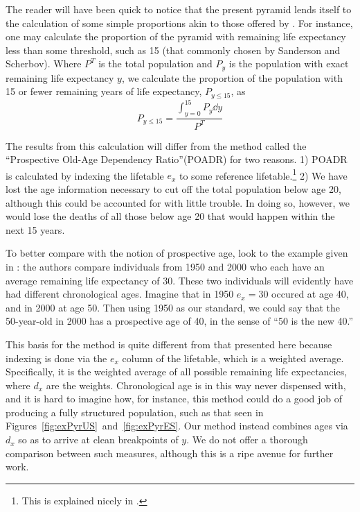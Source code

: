 \FloatBarrier
\label{sec:exageing}
The reader will have been quick to notice that the present pyramid lends itself
to the calculation of some simple proportions akin to those offered by
\citet[e.g.,][]{sanderson2005average}. For instance, one may calculate the
proportion of the pyramid with remaining life expectancy less than some
threshold, such as 15 (that commonly chosen by Sanderson and Scherbov). Where
$P^T$ is the total population and $P_y$ is the population with exact remaining
life expectancy $y$, we calculate the proportion of the population with 15 or
fewer remaining years of life expectancy, $P_{y \le 15}$, as
\begin{equation}
P_{y \le 15} = \frac{\int _{y=0}^{15} P_y \dd y}{P^T}
\end{equation}

The results from this calculation will differ from the method called the
``Prospective Old-Age Dependency Ratio''(POADR) for two reasons. 1) POADR is
calculated by indexing the lifetable $e_x$ to some reference
lifetable.\footnote{This is explained nicely in \citet{sanderson2007new}.} 2)
We have lost the age information necessary to cut off the total population
below age 20, although this could be accounted for with little trouble. In
doing so, however, we would lose the deaths of all those below age 20 that
would happen within the next 15 years. 

To better compare with the notion of prospective age, look to the example given
in \citet{sanderson2007new}: the authors compare
individuals from 1950 and 2000 who each have an average remaining life 
expectancy of 30. These two individuals will 
evidently have had different chronological ages. Imagine that in 1950 $e_x = 30$ 
occured at age 40, and in 2000 at age 50. Then using 1950 as our standard, we 
could say that the 50-year-old in 2000 has a prospective age of 40, in the sense
of ``50 is the new 40.'' 

This basis for the method is quite different from that presented here because
indexing is done via the $e_x$ column of the lifetable, which is a weighted
average. Specifically, it is the weighted average of all possible remaining life
expectancies, where $d_x$ are the weights. Chronological age is in this way
never dispensed with, and it is hard to imagine how, for instance, this method
could do a good job of producing a fully structured population, such as that
seen in Figures~\ref{fig:exPyrUS}~and~\ref{fig:exPyrES}. Our method instead
combines ages via $d_x$ so as to arrive at clean breakpoints of $y$. We do not
offer a thorough comparison between such measures, although this is a ripe
avenue for further work.

